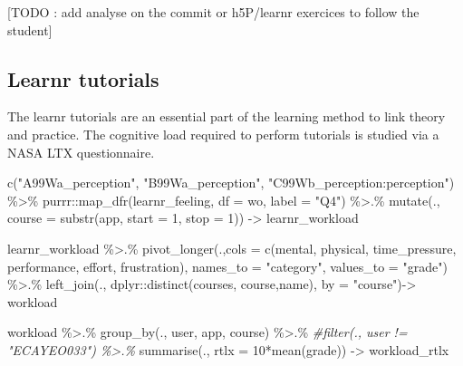 \documentclass[
]{article}
\newenvironment{Shaded}{\begin{snugshade}}{\end{snugshade}}
\newcommand{\AttributeTok}[1]{\textcolor[rgb]{0.77,0.63,0.00}{#1}}
\newcommand{\CommentTok}[1]{\textcolor[rgb]{0.56,0.35,0.01}{\textit{#1}}}
\newcommand{\DecValTok}[1]{\textcolor[rgb]{0.00,0.00,0.81}{#1}}
\newcommand{\FunctionTok}[1]{\textcolor[rgb]{0.00,0.00,0.00}{#1}}
\newcommand{\NormalTok}[1]{#1}
\newcommand{\OtherTok}[1]{\textcolor[rgb]{0.56,0.35,0.01}{#1}}
\newcommand{\SpecialCharTok}[1]{\textcolor[rgb]{0.00,0.00,0.00}{#1}}
\newcommand{\StringTok}[1]{\textcolor[rgb]{0.31,0.60,0.02}{#1}}
\begin{document}
{[}TODO : add analyse on the commit or h5P/learnr exercices to follow
the student{]}

\hypertarget{learnr-tutorials}{%
\subsection{Learnr tutorials}\label{learnr-tutorials}}

The learnr tutorials are an essential part of the learning method to
link theory and practice. The cognitive load required to perform
tutorials is studied via a NASA LTX questionnaire.

\begin{Shaded}
\begin{Highlighting}[]
\FunctionTok{c}\NormalTok{(}\StringTok{"A99Wa\_perception"}\NormalTok{, }\StringTok{"B99Wa\_perception"}\NormalTok{, }\StringTok{"C99Wb\_perception:perception"}\NormalTok{) }\SpecialCharTok{\%\textgreater{}\%}
\NormalTok{  purrr}\SpecialCharTok{::}\FunctionTok{map\_dfr}\NormalTok{(learnr\_feeling, }\AttributeTok{df =}\NormalTok{ wo, }\AttributeTok{label =} \StringTok{"Q4"}\NormalTok{) }\SpecialCharTok{\%\textgreater{}.\%}
  \FunctionTok{mutate}\NormalTok{(., }\AttributeTok{course =} \FunctionTok{substr}\NormalTok{(app, }\AttributeTok{start =} \DecValTok{1}\NormalTok{, }\AttributeTok{stop =} \DecValTok{1}\NormalTok{)) }\OtherTok{{-}\textgreater{}}\NormalTok{ learnr\_workload}

\NormalTok{learnr\_workload }\SpecialCharTok{\%\textgreater{}.\%}
  \FunctionTok{pivot\_longer}\NormalTok{(.,}\AttributeTok{cols =} \FunctionTok{c}\NormalTok{(mental, physical, time\_pressure, performance, effort, frustration),}
  \AttributeTok{names\_to =} \StringTok{"category"}\NormalTok{, }\AttributeTok{values\_to =} \StringTok{"grade"}\NormalTok{)  }\SpecialCharTok{\%\textgreater{}.\%}
  \FunctionTok{left\_join}\NormalTok{(., dplyr}\SpecialCharTok{::}\FunctionTok{distinct}\NormalTok{(courses, course,name), }\AttributeTok{by =} \StringTok{"course"}\NormalTok{)}\OtherTok{{-}\textgreater{}}\NormalTok{ workload}

\NormalTok{workload }\SpecialCharTok{\%\textgreater{}.\%}
  \FunctionTok{group\_by}\NormalTok{(., user, app, course) }\SpecialCharTok{\%\textgreater{}.\%}
  \CommentTok{\#filter(., user != "ECAYEO033") \%\textgreater{}.\%}
  \FunctionTok{summarise}\NormalTok{(., }\AttributeTok{rtlx =} \DecValTok{10}\SpecialCharTok{*}\FunctionTok{mean}\NormalTok{(grade)) }\OtherTok{{-}\textgreater{}}\NormalTok{ workload\_rtlx}


\end{Highlighting}
\end{Shaded}
\end{document}
